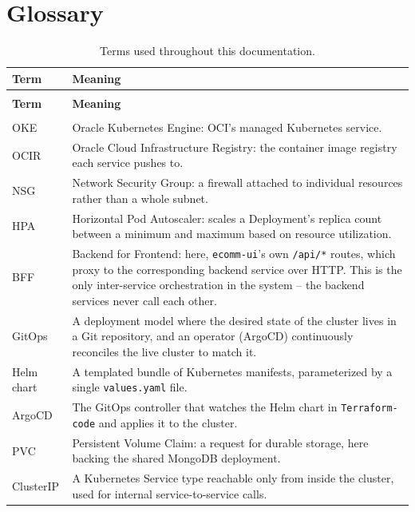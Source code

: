 \appendix

\chapter{Glossary}\label{sec:appendix-glossary}
\begin{longtable}{>{\raggedright\arraybackslash}p{2.6cm} p{\dimexpr\textwidth-2.6cm-4\tabcolsep-12pt\relax}}
\caption{Terms used throughout this documentation.}\label{tab:glossary}\\
\toprule
\textbf{Term} & \textbf{Meaning} \\
\midrule
\endfirsthead
\multicolumn{2}{c}{\textit{Table~\ref{tab:glossary} continued}} \\
\toprule
\textbf{Term} & \textbf{Meaning} \\
\midrule
\endhead
\midrule
\multicolumn{2}{r}{\textit{Continued on next page}} \\
\endfoot
\bottomrule
\endlastfoot
OKE & Oracle Kubernetes Engine: OCI's managed Kubernetes service. \\
OCIR & Oracle Cloud Infrastructure Registry: the container image registry each service pushes to. \\
NSG & Network Security Group: a firewall attached to individual resources rather than a whole subnet. \\
HPA & Horizontal Pod Autoscaler: scales a Deployment's replica count between a minimum and maximum based on resource utilization. \\
BFF & Backend for Frontend: here, \texttt{ecomm-ui}'s own \texttt{/api/*} routes, which proxy to the corresponding backend service over HTTP. This is the only inter-service orchestration in the system -- the backend services never call each other. \\
GitOps & A deployment model where the desired state of the cluster lives in a Git repository, and an operator (ArgoCD) continuously reconciles the live cluster to match it. \\
Helm chart & A templated bundle of Kubernetes manifests, parameterized by a single \texttt{values.yaml} file. \\
ArgoCD & The GitOps controller that watches the Helm chart in \texttt{Terraform-code} and applies it to the cluster. \\
PVC & Persistent Volume Claim: a request for durable storage, here backing the shared MongoDB deployment. \\
ClusterIP & A Kubernetes Service type reachable only from inside the cluster, used for internal service-to-service calls. \\

\end{longtable}
